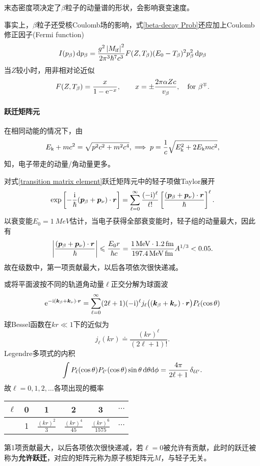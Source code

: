 末态密度项决定了$\beta$粒子的动量谱的形状，会影响衰变速度。

事实上，$\beta$粒子还受核Coulomb场的影响，式\eqref{beta-decay Prob}还应加上Coulomb修正因子(Fermi function)
\begin{align}\label{Fermi funtion}
	I(p_\beta)\mathop{}\!\mathrm{d} p_\beta=\frac{g^2\left\lvert M_{\mathrm{i}\mathrm{f}}\right\rvert^2}{2\pi^3\hbar^7c^3}F(Z,T_\beta)(E_0-T_\beta)^2p_\beta^2\mathop{}\!\mathrm{d} p_\beta
\end{align}
当$Z$较小时，用非相对论近似
\[
	F(Z,T_\beta)=\frac x{1-\mathop{}\!\mathrm{e}^{-x}},\qquad x=\pm\frac{2\pi\alpha Zc}{v_\beta},\quad\text{for}~\beta^\mp.
\]
\paragraph{跃迁矩阵元}在相同动能的情况下，由
\[
	E_{\mathrm k}+mc^2=\sqrt{p^2c^2+m^2c^4},\implies p=\frac1c\sqrt{E_{\mathrm k}^2+2E_{\mathrm k} mc^2},
\]
知，电子带走的动量/角动量更多。

对式\eqref{transition matrix element}跃迁矩阵元中的轻子项做Taylor展开
\begin{align*}
	\exp\left[-\frac{\mathrm{i}}\hbar(\bm p_\beta+\bm p_\nu)\cdot\bm r\right]=\sum_{\ell=0}^\infty\frac{(-\mathrm{i})^\ell}{\ell!}\left[\frac{(\bm p_\beta+\bm p_\nu)\cdot\bm r}\hbar\right]^\ell.
\end{align*}
以衰变能$E_0=\SI{1}{MeV}$估计，当电子获得全部衰变能时，轻子组的动量最大，因此有
\[
	\left\lvert\frac{(\bm p_\beta+\bm p_\nu)\cdot\bm r}\hbar\right\rvert\leqslant\frac{E_0r}{\hbar c}=\frac{\SI{1}{MeV}\cdot\SI{1.2}{fm}}{\SI{197.4}{MeV.fm}}A^{1/3}<0.05.
\]
故在级数中，第一项贡献最大，以后各项依次很快递减。

或将平面波按不同的轨道角动量$\ell$正交分解为球面波
\[
	\mathop{}\!\mathrm{e}^{-\mathrm{i}(\bm k_\beta+\bm k_\nu)\cdot\bm r}=\sum_{\ell=0}^\infty(2\ell+1)(-\mathrm{i})^\ell j_\ell\bigl((\bm k_\beta+\bm k_\nu)\cdot\bm r\bigr)P_\ell(\cos\theta)
\]
球Bessel函数在$kr\ll 1$下的近似为
\[
	j_\ell(kr)\doteq\frac{(kr)^\ell}{(2\ell+1)!}.
\]
Legendre多项式的内积
\[
	\int P_\ell(\cos\theta)P_{\ell'}(\cos\theta)\sin\theta\mathop{}\!\mathrm{d}\theta\mathrm{d}\phi=\frac{4\pi}{2\ell+1}\mathop{}\!\delta_{\ell\ell'}.
\]
故$\ell=0,1,2,\ldots$各项出现的概率
\begin{center}
	\begin{tabular}{cccccc}
		\toprule
		$\ell$&0&1&2&3&$\cdots$\\
		\midrule
		&1&$\frac{(kr)^2}3$&$\frac{(kr)^4}{45}$&$\frac{(kr)^6}{1575}$&$\cdots$\\
		\bottomrule
	\end{tabular}
\end{center}
第1项贡献最大，以后各项依次很快递减，若$\ell=0$被允许有贡献，此时的跃迁被称为\textbf{允许跃迁}，对应的矩阵元称为原子核矩阵元$M$，与轻子无关。

